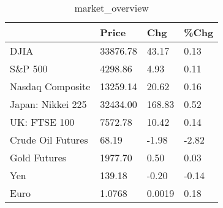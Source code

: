 \documentclass{article}%
\begin{document}
%


\begin{table}[htbp]%
\caption{market\_overview}%
\centering%
\begin{adjustbox}{width=1\textwidth}%
\begin{tabular}{llll}
\toprule
                  &    Price &    Chg &  \%Chg \\
\midrule
             DJIA & 33876.78 &  43.17 &  0.13 \\
          S\&P 500 &  4298.86 &   4.93 &  0.11 \\
 Nasdaq Composite & 13259.14 &  20.62 &  0.16 \\
Japan: Nikkei 225 & 32434.00 & 168.83 &  0.52 \\
     UK: FTSE 100 &  7572.78 &  10.42 &  0.14 \\
Crude Oil Futures &    68.19 &  -1.98 & -2.82 \\
     Gold Futures &  1977.70 &   0.50 &  0.03 \\
              Yen &   139.18 &  -0.20 & -0.14 \\
             Euro &   1.0768 & 0.0019 &  0.18 \\
\bottomrule
\end{tabular}
%
\end{adjustbox}%
\end{table}

%
\end{document}

